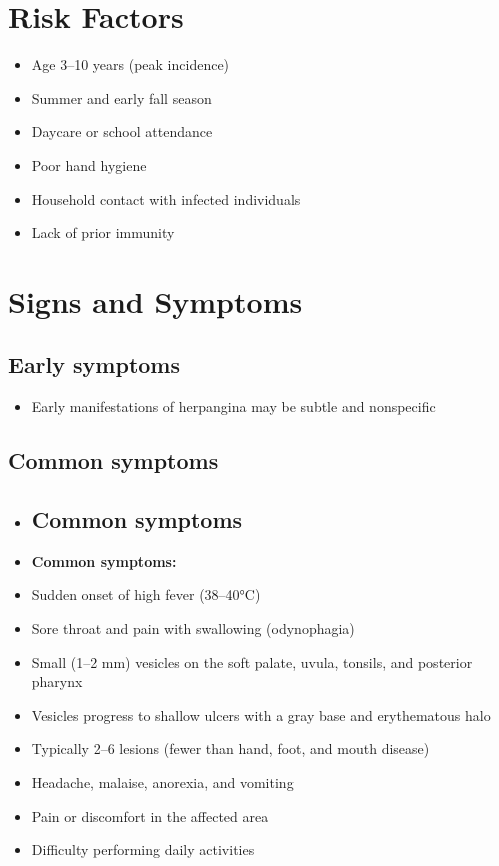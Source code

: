 \section{Risk Factors}

\begin{itemize}[noitemsep]
  \item Age 3--10 years (peak incidence)
  \item Summer and early fall season
  \item Daycare or school attendance
  \item Poor hand hygiene
  \item Household contact with infected individuals
  \item Lack of prior immunity
\end{itemize}

\section{Signs and Symptoms}

\subsection{Early symptoms}
\begin{itemize}[noitemsep]
  \item Early manifestations of herpangina may be subtle and nonspecific
\end{itemize}

\subsection{Common symptoms}
\begin{itemize}[noitemsep]
  \item \subsection{Common symptoms}
  \item \textbf{Common symptoms:}
  \item Sudden onset of high fever (38--40°C)
  \item Sore throat and pain with swallowing (odynophagia)
  \item Small (1--2 mm) vesicles on the soft palate, uvula, tonsils, and posterior pharynx
  \item Vesicles progress to shallow ulcers with a gray base and erythematous halo
  \item Typically 2--6 lesions (fewer than hand, foot, and mouth disease)
  \item Headache, malaise, anorexia, and vomiting
  \item Pain or discomfort in the affected area
  \item Difficulty performing daily activities
\end{itemize}

